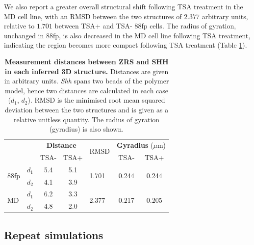 \documentclass[a4paper,11pt,oneside]{book}
\begin{document}
We also report a greater overall structural shift following TSA treatment in the MD cell line, with an RMSD between the two structures of $2.377$ arbitrary units, relative to $1.701$ between TSA+ and TSA- 88fp cells. The radius of gyration, unchanged in 88fp, is also decreased in the MD cell line following TSA treatment, indicating the region becomes more compact following TSA treatment (Table \ref{tab:3ddist}).

\begin{table}[]
\centering
\caption[Measurement distances between ZRS and SHH in each inferred 3D structure.]{ {\bf Measurement distances between ZRS and SHH in each inferred 3D structure. }
Distances are given in arbitrary units. \emph{Shh} spans two beads of the polymer model, hence two distances are calculated in each case ($d_1$, $d_2$). RMSD is the minimised root mean squared deviation between the two structures and is given as a relative unitless quantity. The radius of gyration (gyradius) is also shown.
}
\label{tab:3ddist}
\begin{tabular}{ll|cc|l|cc|}
                      &    & \multicolumn{2}{c|}{{\bf Distance}} & \multirow{2}{*}{RMSD}   & \multicolumn{2}{c|}{{\bf Gyradius } ($\mu$m)}             \\
                      &    & TSA-             & TSA+             &                        & TSA-                   & TSA+                   \\ \hline
\multirow{2}{*}{88fp} & $d_1$ & 5.4              & 5.1              & \multirow{2}{*}{1.701} & \multirow{2}{*}{0.244} & \multirow{2}{*}{0.244} \\
                      & $d_2$ & 4.1              & 3.9              &                        &                        &                        \\ \hline
\multirow{2}{*}{MD}   & $d_1$ & 6.2              & 3.3              & \multirow{2}{*}{2.377} & \multirow{2}{*}{0.217} & \multirow{2}{*}{0.205} \\
                      & $d_2$ & 4.8              & 2.0              &                        &                        &                        \\ \hline
\end{tabular}
\end{table}

\subsection{Repeat simulations}
\end{document}
